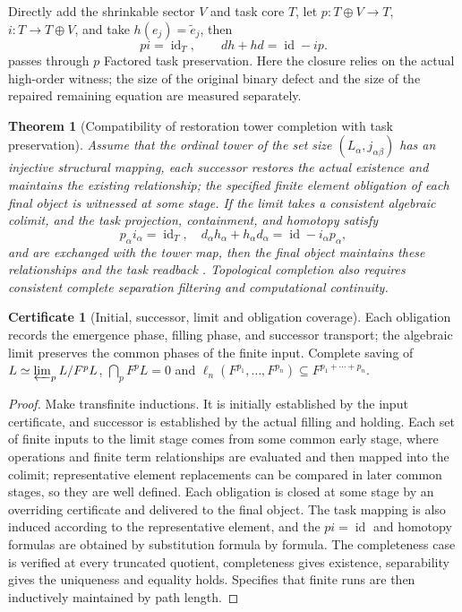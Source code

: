 \documentclass[11pt,a4paper]{article}
\theoremstyle{plain}
\newtheorem{theorem}{Theorem}[section]
\theoremstyle{definition}
\newtheorem*{certificate}{Certificate}
\theoremstyle{remark}
\begin{document}
\begin{CJK*}
Directly add the shrinkable sector $V$ and task core $T$, let $p:T\oplus V\to T$, $i:T\to T\oplus V$, and take $h(e_j)=\widetilde e_j$, then \[
 pi=\operatorname{id}_T,\qquad dh+hd=\operatorname{id}-ip.
\] passes through $p$ Factored task preservation. Here the closure relies on the actual high-order witness; the size of the original binary defect and the size of the repaired remaining equation are measured separately.

\begin{theorem}
[Compatibility of restoration tower completion with task preservation]\label{pc:transfinite}
Assume that the ordinal tower of the set size $(L_\alpha,j_{\alpha\beta})$ has an injective structural mapping, each successor restores the actual existence and maintains the existing relationship; the specified finite element obligation of each final object is witnessed at some stage. If the limit takes a consistent algebraic colimit, and the task projection, containment, and homotopy satisfy \[
 p_\alpha i_\alpha=\operatorname{id}_T,\quad
 d_\alpha h_\alpha+h_\alpha d_\alpha=\operatorname{id}-i_\alpha p_\alpha,
\] and are exchanged with the tower map, then the final object maintains these relationships and the task readback . Topological completion also requires consistent complete separation filtering and computational continuity.\end{theorem}
\begin{certificate}
[Initial, successor, limit and obligation coverage]Each obligation records the emergence phase, filling phase, and successor transport; the algebraic limit preserves the common phases of the finite input. Complete saving of $L\simeq\varprojlim_pL/F^pL$, $\bigcap_pF^pL=0$ and $\ell_n(F^{p_1},\ldots,F^{p_n})\subseteq F^{p_1+\cdots+p_n}$.\end{certificate}
\begin{proof}
Make transfinite inductions. It is initially established by the input certificate, and successor is established by the actual filling and holding. Each set of finite inputs to the limit stage comes from some common early stage, where operations and finite term relationships are evaluated and then mapped into the colimit; representative element replacements can be compared in later common stages, so they are well defined. Each obligation is closed at some stage by an overriding certificate and delivered to the final object. The task mapping is also induced according to the representative element, and the $pi=\operatorname{id}$ and homotopy formulas are obtained by substitution formula by formula. The completeness case is verified at every truncated quotient, completeness gives existence, separability gives the uniqueness and equality holds. Specifies that finite runs are then inductively maintained by path length.\end{proof}



\end{CJK*}
\end{document}
